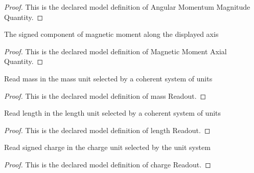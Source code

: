 \begin{proof}
  This is the declared model definition of Angular Momentum Magnitude Quantity.
\end{proof}
\begin{definition}
  \label{def:physics:phyx-mini-0563:phyxminiproblems-problemphyxmini0563-magneticmomentaxialquantity}
  The signed component of magnetic moment along the displayed axis
\end{definition}
\begin{proof}
  This is the declared model definition of Magnetic Moment Axial Quantity.
\end{proof}
\begin{definition}
  \label{def:physics:phyx-mini-0563:phyxminiproblems-problemphyxmini0563-massreadout}
  Read mass in the mass unit selected by a coherent system of units
\end{definition}
\begin{proof}
  This is the declared model definition of mass Readout.
\end{proof}
\begin{definition}
  \label{def:physics:phyx-mini-0563:phyxminiproblems-problemphyxmini0563-lengthreadout}
  Read length in the length unit selected by a coherent system of units
\end{definition}
\begin{proof}
  This is the declared model definition of length Readout.
\end{proof}
\begin{definition}
  \label{def:physics:phyx-mini-0563:phyxminiproblems-problemphyxmini0563-chargereadout}
  Read signed charge in the charge unit selected by the unit system
\end{definition}
\begin{proof}
  This is the declared model definition of charge Readout.
\end{proof}
